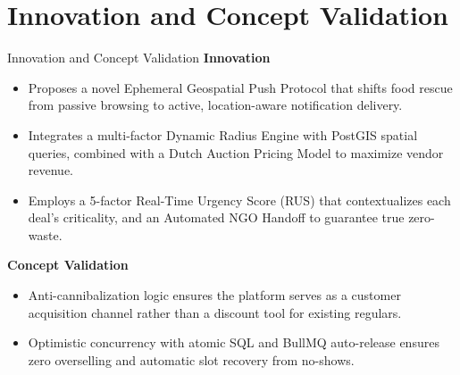 \documentclass[aspectratio=169,xcolor=dvipsnames]{beamer}
\begin{document}
\section{Innovation and Concept Validation}
\begin{frame}{Innovation and Concept Validation}
\justifying
\textbf{Innovation}
\begin{itemize}
    \item Proposes a novel Ephemeral Geospatial Push Protocol that shifts food rescue from passive browsing to active, location-aware notification delivery.
    
    \item Integrates a multi-factor Dynamic Radius Engine with PostGIS spatial queries, combined with a Dutch Auction Pricing Model to maximize vendor revenue.
    
    \item Employs a 5-factor Real-Time Urgency Score (RUS) that contextualizes each deal's criticality, and an Automated NGO Handoff to guarantee true zero-waste.
\end{itemize}

\textbf{Concept Validation}
\begin{itemize}
    \item Anti-cannibalization logic ensures the platform serves as a customer acquisition channel rather than a discount tool for existing regulars.
    
    \item Optimistic concurrency with atomic SQL and BullMQ auto-release ensures zero overselling and automatic slot recovery from no-shows.
\end{itemize}
\end{frame}

\end{document}
